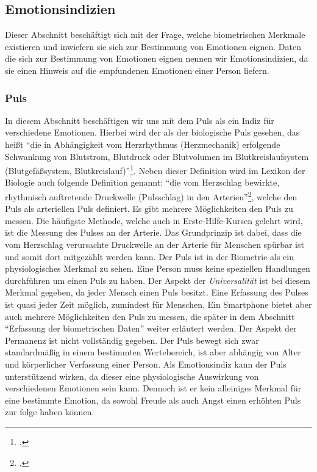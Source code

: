 \subsection{Emotionsindizien}
\label{section:Emotionsindizien}
Dieser Abschnitt beschäftigt sich mit der Frage, welche biometrischen Merkmale existieren und inwiefern sie sich zur Bestimmung von Emotionen eignen. Daten die sich zur Bestimmung von Emotionen eignen nennen wir Emotionsindizien, da sie einen Hinweis auf die empfundenen Emotionen einer Person liefern.
\subsubsection{Puls}
In diesem Abschnitt beschäftigen wir uns mit dem Puls als ein Indiz für verschiedene Emotionen. Hierbei wird der als der biologische Puls gesehen, das heißt ``die in Abhängigkeit vom Herzrhythmus (Herzmechanik) erfolgende Schwankung von Blutstrom, Blutdruck oder Blutvolumen im Blutkreislaufsystem (Blutgefäßsystem, Blutkreislauf)''\footcite{Spe18}. Neben dieser Definition wird im Lexikon der Biologie auch folgende Definition genannt: ``die vom Herzschlag bewirkte, rhythmisch auftretende Druckwelle (Pulsschlag) in den Arterien''\footcite{Spe18}, welche den Puls als arteriellen Puls definiert. \newline
Es gibt mehrere Möglichkeiten den Puls zu messen. Die häufigste Methode, welche auch in Erste-Hilfe-Kursen gelehrt wird, ist die Messung des Pulses an der Arterie. Das Grundprinzip ist dabei, dass die vom Herzschlag verursachte Druckwelle an der Arterie für Menschen spürbar ist und somit dort mitgezählt werden kann.\newline
Der Puls ist in der Biometrie als ein physiologisches Merkmal zu sehen. Eine Person muss keine speziellen Handlungen durchführen um einen Puls zu haben. Der Aspekt der \textit{Universalität} ist bei diesem Merkmal gegeben, da jeder Mensch einen Puls besitzt. Eine Erfassung des Pulses ist quasi jeder Zeit möglich, zumindest für Menschen. Ein Smartphone bietet aber auch mehrere Möglichkeiten den Puls zu messen, die später in dem Abschnitt ``Erfassung der biometrischen Daten'' weiter erläutert werden. Der Aspekt der Permanenz ist nicht vollständig gegeben. Der Puls bewegt sich zwar standardmäßig in einem bestimmten Wertebereich, ist aber abhängig von Alter und körperlicher Verfassung einer Person.\newline
Als Emotionsindiz kann der Puls unterstützend wirken, da dieser eine physiologische Auswirkung von verschiedenen Emotionen sein kann. Dennoch ist er kein alleiniges Merkmal für eine bestimmte Emotion, da sowohl Freude als auch Angst einen erhöhten Puls zur folge haben können.
